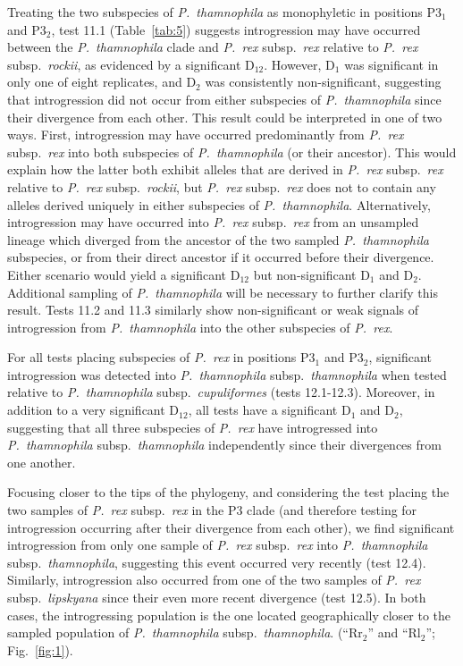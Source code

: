 \documentclass[12pt,letterpaper]{article}
\begin{document}
Treating the two subspecies of \emph{P.~thamnophila} as monophyletic
in positions P3$_1$ and P3$_2$, test 11.1 (Table~\ref{tab:5}) suggests
introgression may have occurred between the \emph{P.~thamnophila}
clade and \emph{P.~rex} subsp.\ \emph{rex} relative to \emph{P.~rex}
subsp.\ \emph{rockii}, as evidenced by a significant
D$_{12}$.  However, D$_1$ was significant in only one of
eight replicates, and D$_2$ was consistently non-significant,
suggesting that introgression did not occur from either subspecies of
\emph{P.~thamnophila} since their divergence from each other.  This
result could be interpreted in one of two ways. First, introgression
may have occurred predominantly from \emph{P.~rex} subsp.\ \emph{rex}
into both subspecies of \emph{P.~thamnophila} (or their ancestor).
This would explain how the latter both exhibit alleles that are
derived in \emph{P.~rex} subsp.\ \emph{rex} relative to \emph{P.~rex}
subsp.\ \emph{rockii}, but \emph{P.~rex} subsp.\ \emph{rex} does not
to contain any alleles derived uniquely in either subspecies of
\emph{P.~thamnophila}.  Alternatively, introgression may have occurred
into \emph{P.~rex} subsp.\ \emph{rex} from an 
unsampled lineage which diverged from the ancestor of the 
two sampled \emph{P.~thamnophila} subspecies, or from their direct
ancestor if it occurred before their divergence. Either scenario would
yield a significant D$_{12}$ but non-significant D$_1$ and D$_2$. 
Additional sampling of \emph{P.~thamnophila} will be necessary to
further clarify this result.  Tests 11.2 and 11.3 similarly show
non-significant or weak signals of introgression from
\emph{P.~thamnophila} into the other subspecies of \emph{P.~rex}.

For all tests placing subspecies of \emph{P.~rex} in positions P3$_1$
and P3$_2$, significant introgression was detected into
\emph{P.~thamnophila} subsp.\ \emph{thamnophila} when tested relative
to \emph{P.~thamnophila} subsp.\ \emph{cupuliformes} (tests
12.1-12.3).  Moreover, in addition to a very significant D$_{12}$, all
tests have a significant D$_1$ and D$_2$, suggesting that all
three subspecies of \emph{P.~rex} have introgressed into
\emph{P.~thamnophila} subsp.\ \emph{thamnophila} independently since
their divergences from one another.

Focusing closer to the tips of the phylogeny, and
considering %
the test placing the two samples of \emph{P.~rex} subsp.\ \emph{rex}
in the P3 clade (and therefore testing for introgression occurring
after their divergence from each other), we find significant
introgression from only one sample of \emph{P.~rex} subsp.\ \emph{rex}
into \emph{P.~thamnophila} subsp.\ \emph{thamnophila}, suggesting this
event occurred very recently (test 12.4).  Similarly, introgression
also occurred from one of the two samples of \emph{P.~rex} subsp.\
\emph{lipskyana} since their even more recent divergence (test
12.5). In both cases, the introgressing population is the one located
geographically closer to the sampled population of
\emph{P.~thamnophila} subsp.\ \emph{thamnophila}.  (``Rr$_2$'' and
``Rl$_2$''; Fig.~\ref{fig:1}).
\end{document}
